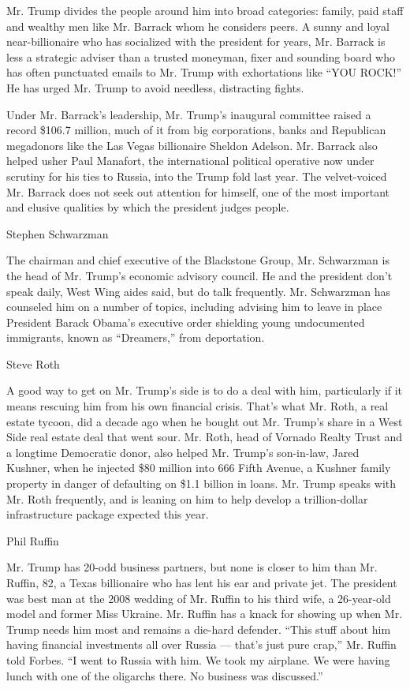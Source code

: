 Mr. Trump divides the people around him into broad categories: family,
paid staff and wealthy men like Mr. Barrack whom he considers peers. A
sunny and loyal near-billionaire who has socialized with the president
for years, Mr. Barrack is less a strategic adviser than a trusted
moneyman, fixer and sounding board who has often punctuated emails to
Mr. Trump with exhortations like ``YOU ROCK!'' He has urged Mr. Trump to
avoid needless, distracting fights.

Under Mr. Barrack's leadership, Mr. Trump's inaugural committee raised a
record \$106.7 million, much of it from big corporations, banks and
Republican megadonors like the Las Vegas billionaire Sheldon Adelson.
Mr. Barrack also helped usher Paul Manafort, the international political
operative now under scrutiny for his ties to Russia, into the Trump fold
last year. The velvet-voiced Mr. Barrack does not seek out attention for
himself, one of the most important and elusive qualities by which the
president judges people.

Stephen Schwarzman

The chairman and chief executive of the Blackstone Group, Mr. Schwarzman
is the head of Mr. Trump's economic advisory council. He and the
president don't speak daily, West Wing aides said, but do talk
frequently. Mr. Schwarzman has counseled him on a number of topics,
including advising him to leave in place President Barack Obama's
executive order shielding young undocumented immigrants, known as
``Dreamers,'' from deportation.

Steve Roth

A good way to get on Mr. Trump's side is to do a deal with him,
particularly if it means rescuing him from his own financial crisis.
That's what Mr. Roth, a real estate tycoon, did a decade ago when he
bought out Mr. Trump's share in a West Side real estate deal that went
sour. Mr. Roth, head of Vornado Realty Trust and a longtime Democratic
donor, also helped Mr. Trump's son-in-law, Jared Kushner, when he
injected \$80 million into 666 Fifth Avenue, a Kushner family property
in danger of defaulting on \$1.1 billion in loans. Mr. Trump speaks with
Mr. Roth frequently, and is leaning on him to help develop a
trillion-dollar infrastructure package expected this year.

Phil Ruffin

Mr. Trump has 20-odd business partners, but none is closer to him than
Mr. Ruffin, 82, a Texas billionaire who has lent his ear and private
jet. The president was best man at the 2008 wedding of Mr. Ruffin to his
third wife, a 26-year-old model and former Miss Ukraine. Mr. Ruffin has
a knack for showing up when Mr. Trump needs him most and remains a
die-hard defender. ``This stuff about him having financial investments
all over Russia --- that's just pure crap,'' Mr. Ruffin told Forbes. ``I
went to Russia with him. We took my airplane. We were having lunch with
one of the oligarchs there. No business was discussed.''


